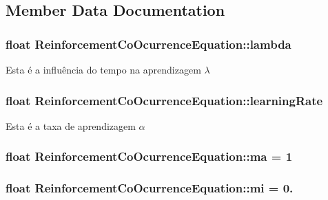 \subsection{Member Data Documentation}
\hypertarget{class_reinforcement_co_ocurrence_equation_a698939519d58a0da4a079822a1d65e87}{
\subsubsection[{lambda}]{\setlength{\rightskip}{0pt plus 5cm}float Reinforcement\+Co\+Ocurrence\+Equation\+::lambda\hspace{0.3cm}{\ttfamily [private]}}}\label{class_reinforcement_co_ocurrence_equation_a698939519d58a0da4a079822a1d65e87}
Esta é a influência do tempo na aprendizagem $ \lambda $ \hypertarget{class_reinforcement_co_ocurrence_equation_a643eafe5a80172a58cd54512e57d3421}{
\subsubsection[{learning\+Rate}]{\setlength{\rightskip}{0pt plus 5cm}float Reinforcement\+Co\+Ocurrence\+Equation\+::learning\+Rate\hspace{0.3cm}{\ttfamily [private]}}}\label{class_reinforcement_co_ocurrence_equation_a643eafe5a80172a58cd54512e57d3421}
Esta é a taxa de aprendizagem $ \alpha $ \hypertarget{class_reinforcement_co_ocurrence_equation_ac25055b41571d4b146d2fd0695e642ba}{
\subsubsection[{ma}]{\setlength{\rightskip}{0pt plus 5cm}float Reinforcement\+Co\+Ocurrence\+Equation\+::ma = 1\hspace{0.3cm}{\ttfamily [private]}}}\label{class_reinforcement_co_ocurrence_equation_ac25055b41571d4b146d2fd0695e642ba}
\hypertarget{class_reinforcement_co_ocurrence_equation_a31a1e4a2ba8239ddb2c08f7d24f30e29}{
\subsubsection[{mi}]{\setlength{\rightskip}{0pt plus 5cm}float Reinforcement\+Co\+Ocurrence\+Equation\+::mi = 0.\hspace{0.3cm}{\ttfamily [private]}}}\label{class_reinforcement_co_ocurrence_equation_a31a1e4a2ba8239ddb2c08f7d24f30e29}
